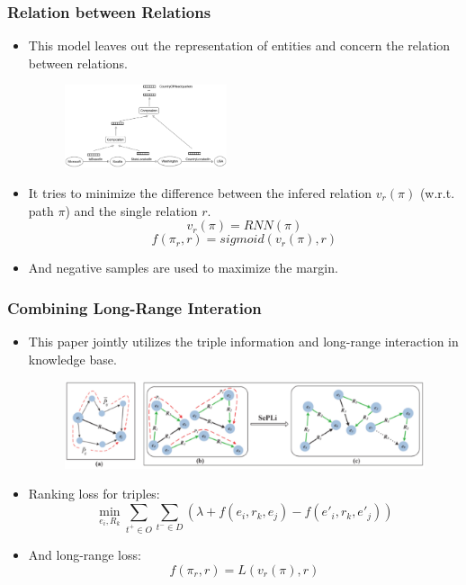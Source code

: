 \documentclass[pdf,10pt]{beamer}
\begin{document}
\begin{frame}
\frametitle{Relation between Relations \citep{bowman2014recursive}}
\begin{itemize}
	\item This model leaves out the representation of entities and concern the relation between relations.
		\begin{figure}
			\includegraphics[width=0.45\textwidth]{8.eps}
		\end{figure}
	\item It tries to minimize the difference between the infered relation $v_r(\pi)$ (w.r.t. path $\pi$) and the single relation $r$.
		$$v_r(\pi)=RNN(\pi)$$
		$$f(\pi_r,r) = sigmoid(v_r(\pi), r)$$
	\item And negative samples are used to maximize the margin.
\end{itemize}
\end{frame}

\begin{frame}
\frametitle{Combining Long-Range Interation \citep{wu2015structured}}
	\begin{itemize}
		\item This paper jointly utilizes the triple information and long-range interaction in knowledge base.
			\begin{figure}
				\centering
				\includegraphics[height=0.15\textwidth]{9.eps}
			\end{figure}
		\item Ranking loss for triples:
			$$\min_{e_i,R_k}\sum_{t^+ \in O}\sum_{t^- \in D}{(\lambda + f(e_i,r_k,e_j) - f(e'_i,r_k,e'_j))}$$
		\item And long-range loss:
			$$f(\pi_r,r) = L(v_r(\pi), r)$$
	\end{itemize}
\end{frame}
\end{document}
